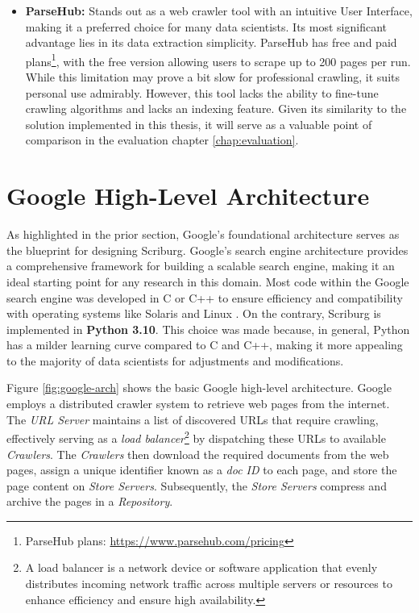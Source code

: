 \begin{itemize}
  \item[] \textbf{ParseHub:} Stands out as a web crawler tool with an intuitive User Interface, making it a preferred choice for many data scientists. Its most significant advantage lies in its data extraction simplicity. ParseHub has free and paid plans\footnote{ParseHub plans: \url{https://www.parsehub.com/pricing}}, with the free version allowing users to scrape up to 200 pages per run. While this limitation may prove a bit slow for professional crawling, it suits personal use admirably. However, this tool lacks the ability to fine-tune crawling algorithms and lacks an indexing feature. Given its similarity to the solution implemented in this thesis, it will serve as a valuable point of comparison in the evaluation chapter \ref{chap:evaluation}. 
\end{itemize}

\section{Google High-Level Architecture}\label{sec:high-level-google-architecture}

As highlighted in the prior section, Google's foundational architecture serves as the blueprint for designing Scriburg. Google's search engine architecture provides a comprehensive framework for building a scalable search engine, making it an ideal starting point for any research in this domain. Most code within the Google search engine was developed in C or C++ to ensure efficiency and compatibility with operating systems like Solaris and Linux \cite{brin1998anatomy}. On the contrary, Scriburg is implemented in \textbf{Python 3.10}. This choice was made because, in general, Python has a milder learning curve compared to C and C++, making it more appealing to the majority of data scientists for adjustments and modifications.

Figure \ref{fig:google-arch} shows the basic Google high-level architecture. Google employs a distributed crawler system to retrieve web pages from the internet. The \textit{URL Server} maintains a list of discovered URLs that require crawling, effectively serving as a \textit{load balancer}\footnote{A load balancer is a network device or software application that evenly distributes incoming network traffic across multiple servers or resources to enhance efficiency and ensure high availability.} by dispatching these URLs to available \textit{Crawlers}. The \textit{Crawlers} then download the required documents from the web pages, assign a unique identifier known as a \textit{doc ID} to each page, and store the page content on \textit{Store Servers}. Subsequently, the \textit{Store Servers} compress and archive the pages in a \textit{Repository}.


